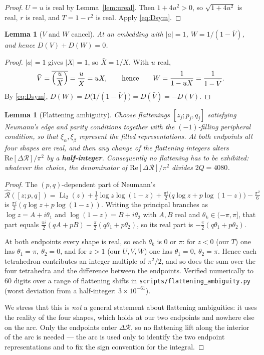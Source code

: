 \documentclass[11pt]{article}
\newtheorem{lemma}[theorem]{Lemma}
\theoremstyle{remark}
\begin{document}
\begin{proof}
$U=u$ is real by Lemma~\ref{lem:ureal}. Then $1+4u^2>0$, so $\sqrt{1+4u^2}$ is
real, $r$ is real, and $T=1-r^2$ is real. Apply \eqref{eq:Dsym}.
\end{proof}

\begin{lemma}[$V$ and $W$ cancel]\label{lem:VW}
At an embedding with $|a|=1$, $W=1/(1-\bar V)$, and hence $D(V)+D(W)=0$.
\end{lemma}

\begin{proof}
$|a|=1$ gives $|X|=1$, so $\bar X=1/X$. With $u$ real,
\[
\bar V=\overline{\Bigl(\frac uX\Bigr)}=\frac u{\bar X}=uX,
\qquad\text{hence}\qquad
W=\frac1{1-uX}=\frac1{1-\bar V}.
\]
By \eqref{eq:Dsym}, $D(W)=D\bigl(1/(1-\bar V)\bigr)=D(\bar V)=-D(V)$.
\end{proof}

\begin{lemma}[Flattening ambiguity]\label{lem:fill}
Choose flattenings $[z_j;p_j,q_j]$ satisfying Neumann's edge and parity
conditions together with the $(-1)$-filling peripheral condition, so that
$\xi_\alpha,\xi_\beta$ represent the filled representations. At both endpoints
all four shapes are \emph{real}, and then \emph{any} change of the flattening
integers alters $\mathrm{Re}[\Delta\mathcal R]/\pi^2$ by a
\textbf{half-integer}. Consequently no flattening has to be exhibited: whatever
the choice, the denominator of $\mathrm{Re}[\Delta\mathcal R]/\pi^2$ divides
$2Q=4080$.
\end{lemma}

\begin{proof}
The $(p,q)$-dependent part of Neumann's
$\widehat{\mathcal R}([z;p,q])
=\operatorname{Li}_2(z)+\tfrac12\log z\log(1-z)+\tfrac{\pi i}2\bigl(q\log z+p\log(1-z)\bigr)
-\tfrac{\pi^2}6$
is $\tfrac{\pi i}2(q\log z+p\log(1-z))$. Writing the principal branches as
$\log z=A+i\theta_1$ and $\log(1-z)=B+i\theta_2$ with $A,B$ real and
$\theta_k\in(-\pi,\pi]$, that part equals
$\tfrac{\pi i}2(qA+pB)-\tfrac\pi2(q\theta_1+p\theta_2)$, so its real part is
$-\tfrac\pi2(q\theta_1+p\theta_2)$.

At both endpoints every shape is real, so each $\theta_k$ is $0$ or $\pi$:
for $z<0$ (our $T$) one has $\theta_1=\pi,\ \theta_2=0$, and for $z>1$ (our
$U,V,W$) one has $\theta_1=0,\ \theta_2=\pi$. Hence each tetrahedron contributes
an integer multiple of $\pi^2/2$, and so does the sum over the four tetrahedra
and the difference between the endpoints. Verified numerically to $60$ digits
over a range of flattening shifts in \texttt{scripts/flattening\_ambiguity.py}
(worst deviation from a half-integer: $3\times10^{-61}$).

We stress that this is \emph{not} a general statement about flattening
ambiguities: it uses the reality of the four shapes, which holds at our two
endpoints and nowhere else on the arc. Only the endpoints enter
$\Delta\mathcal R$, so no flattening lift along the interior of the arc is
needed --- the arc is used only to identify the two endpoint representations and
to fix the sign convention for the integral.
\end{proof}
\end{document}
